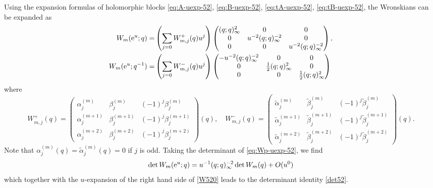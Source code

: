 \documentclass[12pt,reqno]{amsart}
\theoremstyle{definition}
\def\wt{\widetilde}
\def\re{{\rm e}}
\begin{document}
Using the expansion formulas of holomorphic blocks \eqref{eq:A-uexp-52},
\eqref{eq:B-uexp-52}, \eqref{eq:tA-uexp-52}, \eqref{eq:tB-uexp-52},
the Wronskians can be expanded as
\begin{align}
  W_m(\re^u;q) =
  &\left(\sum_{j=0}W^+_{m,j}(q)u^j\right)
  \begin{pmatrix}
    (q;q)_\infty^{2}&0&0\\
    0&u^{-2}(q;q)_\infty^{-2}&0\\
    0&0&u^{-2}(q;q)_\infty^{-2}
  \end{pmatrix},
         \label{eq:Wp-uexp-52}\\
  W_m(\re^u;q^{-1}) =
  &\left(\sum_{j=0}W_{m,j}^-(q)u^j\right)
  \begin{pmatrix}
    -u^{-2}(q;q)_\infty^{-2}&0&0\\
    0&\frac{1}{2}(q;q)_\infty^{2}&0\\
    0&0&\frac{1}{2}(q;q)_\infty^2
  \end{pmatrix}
  \label{eq:Wn-uexp-52}
\end{align}%
where
\begin{equation}
  W_{m,j}^+(q) =
  \begin{pmatrix}
    \alpha_j^{(m)} & \beta_j^{(m)} & (-1)^j\beta_j^{(m)}\\
    \alpha_j^{(m+1)} & \beta_j^{(m+1)} & (-1)^j\beta_j^{(m+1)}\\
    \alpha_j^{(m+2)} & \beta_j^{(m+2)} & (-1)^j\beta_j^{(m+2)}
  \end{pmatrix}(q), \quad W_{m,j}^-(q) =
  \begin{pmatrix}
    \wt{\alpha}_j^{(m)} & \wt{\beta}_j^{(m)} & (-1)^j\wt{\beta}_j^{(m)}\\
    \wt{\alpha}_j^{(m+1)} & \wt{\beta}_j^{(m+1)} & (-1)^j\wt{\beta}_j^{(m+1)}\\
    \wt{\alpha}_j^{(m+2)} & \wt{\beta}_j^{(m+2)} &
    (-1)^j\wt{\beta}_j^{(m+2)}
  \end{pmatrix}(q).
\end{equation}
Note that $\alpha_j^{(m)}(q) = \wt{\alpha}_j^{(m)}(q) = 0$ if $j$ is odd.
Taking the determinant of \eqref{eq:Wp-uexp-52}, we find
\begin{equation}
  \det W_m(\re^u;q) = u^{-1}(q;q)_\infty^{-2} \det W_m(q) + O(u^0)
\end{equation}
which together with the $u$-expansion of the right hand side of
\eqref{W520} leads to the determinant identity \eqref{det52}.
\end{document}
